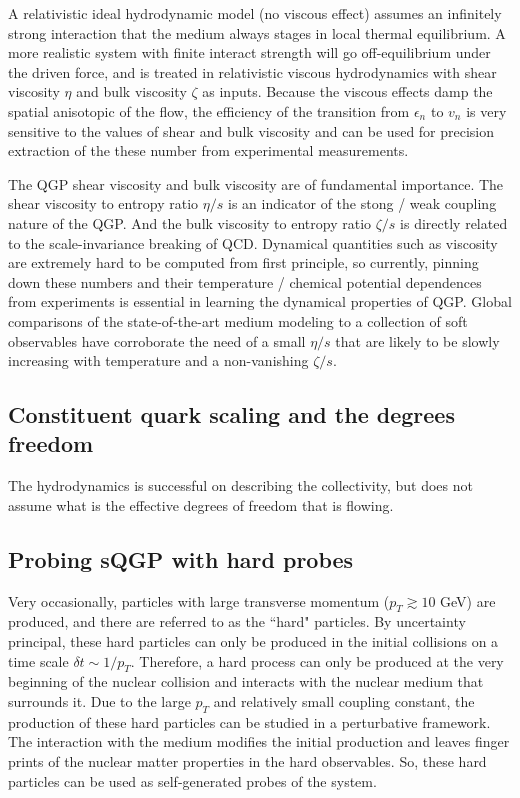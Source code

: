 A relativistic ideal hydrodynamic model (no viscous effect) assumes an infinitely strong interaction that the medium always stages in local thermal equilibrium.
A more realistic system with finite interact strength will go off-equilibrium under the driven force, and is treated in relativistic viscous hydrodynamics with shear viscosity $\eta$ and bulk viscosity $\zeta$ as inputs.
Because the viscous effects damp the spatial anisotopic of the flow, the efficiency of the transition from $\epsilon_n$ to $v_n$ is very sensitive to the values of shear and bulk viscosity and can be used for precision extraction of the these number from experimental measurements.

The QGP shear viscosity and bulk viscosity are of fundamental importance. 
The shear viscosity to entropy ratio $\eta/s$ is an indicator of the stong / weak coupling nature of the QGP. 
And the bulk viscosity to entropy ratio $\zeta/s$ is directly related to  the scale-invariance breaking of QCD.
Dynamical quantities such as viscosity are extremely hard to be computed from first principle, so currently, pinning down these numbers and their temperature / chemical potential dependences from experiments is essential in learning the dynamical properties of QGP.
Global comparisons of the state-of-the-art medium modeling to a collection of soft observables have corroborate the need of a small $\eta/s$ that are likely to be slowly increasing with temperature and a non-vanishing $\zeta/s$.

\subsection{Constituent quark scaling and the degrees freedom}
The hydrodynamics is successful on describing the collectivity, but does not assume what is the effective degrees of freedom that is flowing.


\subsection{Probing sQGP with hard probes}
Very occasionally, particles with large transverse momentum ($p_T\gtrsim 10$ GeV) are produced, and there are referred to as the ``hard" particles.
By uncertainty principal, these hard particles can only be produced in the initial collisions on a time scale $\delta t \sim 1/p_T$.
Therefore, a hard process can only be produced at the very beginning of the nuclear collision and interacts with the nuclear medium that surrounds it.
Due to the large $p_T$ and relatively small coupling constant, the production of these hard particles can be studied in a perturbative framework.
The interaction with the medium modifies the initial production and leaves finger prints of the nuclear matter properties in the hard observables. 
So, these hard particles can be used as self-generated probes of the system.

